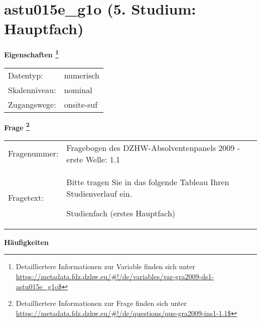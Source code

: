 
    \setcounter{footnote}{0}

    \vspace*{-1.8cm}
	\section{astu015e\_g1o (5. Studium: Hauptfach)}
	\label{section:astu015e_g1o}



    \vspace*{0.5cm}
    \noindent\textbf{Eigenschaften
	\footnote{Detailliertere Informationen zur Variable finden sich unter
		\url{https://metadata.fdz.dzhw.eu/\#!/de/variables/var-gra2009-ds1-astu015e_g1o$}}}\\
	\begin{tabularx}{\hsize}{@{}lX}
	Datentyp: & numerisch \\
	Skalenniveau: & nominal \\
	Zugangswege: &
	  onsite-suf
 \\
    \end{tabularx}



				\vspace*{0.5cm}
                \noindent\textbf{Frage
	                \footnote{Detailliertere Informationen zur Frage finden sich unter
		              \url{https://metadata.fdz.dzhw.eu/\#!/de/questions/que-gra2009-ins1-1.1$}}}\\
				\begin{tabularx}{\hsize}{@{}lX}
					Fragenummer: &
					  Fragebogen des DZHW-Absolventenpanels 2009 - erste Welle:
					  1.1
 \\
					Fragetext: & Bitte tragen Sie in das folgende Tableau Ihren Studienverlauf ein.\par  Studienfach (erstes Hauptfach) \\
				\end{tabularx}





        		\vspace*{0.5cm}
                \noindent\textbf{Häufigkeiten}

